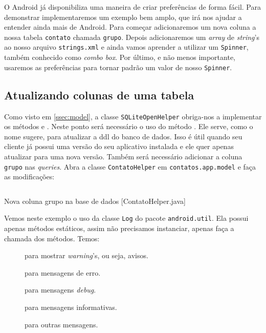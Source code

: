 O Android já disponibiliza uma maneira de criar preferências de forma fácil. Para demonstrar implementaremos
um exemplo bem amplo, que irá nos ajudar a entender ainda mais de Android. Para começar adicionaremos
um nova coluna a nossa tabela \texttt{contato} chamada \texttt{grupo}. Depois adicionaremos um \textit{array}
de \textit{string}'s ao nosso arquivo \texttt{strings.xml} e ainda vamos aprender a utilizar um
\texttt{Spinner}, também conhecido como \textit{combo box}. Por último, e não menos importante, usaremos
as preferências para tornar padrão um valor de nosso \texttt{Spinner}.


\subsection{Atualizando colunas de uma tabela}

Como visto em \ref{ssec:model}, a classe \texttt{SQLiteOpenHelper} obriga-nos a implementar os métodos
 e . Neste ponto será necessário o uso do método .
Ele serve, como o nome sugere, para atualizar a \gls{ddl} do banco de dados. Isso é útil quando seu cliente
já possui uma versão do seu aplicativo instalada e ele quer apenas atualizar para uma nova versão. Também será
necessário adicionar a coluna \texttt{grupo} nas \textit{queries}. Abra a classe \texttt{ContatoHelper} em
\texttt{contatos.app.model} e faça as modificações:

\begin{listing}[H]
  \inputminted[linenos=true,frame=bottomline,tabsize=3]{ java }{ source/ContatoHelper-6.java }
  \caption{Nova coluna grupo na base de dados [ContatoHelper.java]}
\end{listing}

Vemos neste exemplo o uso da classe \texttt{Log} do pacote \texttt{android.util}. Ela possui apenas
métodos estáticos, assim não precisamos instanciar, apenas faça a chamada dos métodos. Temos:
\begin{description}
\item[] para mostrar \textit{warning}'s, ou seja, avisos.
\item[] para mensagens de erro.
\item[] para mensagens \textit{\gls{debug}}.
\item[] para mensagens informativas.
\item[] para outras mensagens.
\end{description}

